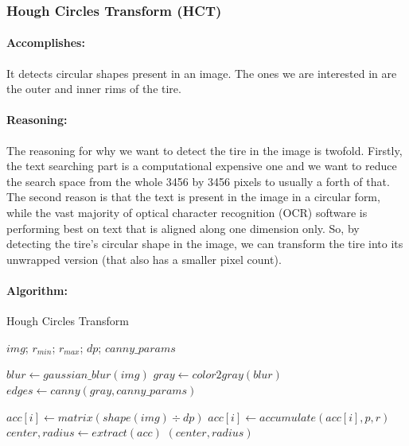 
\subsubsection{Hough Circles Transform (HCT)}
\label{subsubsec:hough_circles_transform}

\paragraph*{Accomplishes:}\mbox{}\par
It detects circular shapes present in an image. The ones we are interested in are the outer and inner rims of the tire.

\paragraph*{Reasoning:}\mbox{}\par
The reasoning for why we want to detect the tire in the image is twofold. Firstly, the text searching part is a computational expensive one and we want to reduce the search space from the whole 3456 by 3456 pixels to usually a forth of that. The second reason is that the text is present in the image in a circular form, while the vast majority of optical character recognition (OCR) software is performing best on text that is aligned along one dimension only. So, by detecting the tire's circular shape in the image, we can transform the tire into its unwrapped version (that also has a smaller pixel count).

\paragraph*{Algorithm:}\mbox{}\par

\begin{algorithm}
    \caption{Hough Circles Transform}\label{alg:Hough_Circles}
    \begin{algorithmic}[1]
        \Require $img$; $r_{min}$; $r_{max}$; $dp$; $canny\_params$

        \State $blur \gets gaussian\_blur(img)$
        \State $gray \gets color2gray(blur)$
        \State $edges \gets canny(gray, canny\_params)$

        \label{line:Hough_Circles:for_r}
            \State $acc[i] \gets matrix(shape(img) \div dp)$
            \label{line:Hough_Circles:for_p}
                \State $acc[i] \gets accumulate(acc[i], p, r)$
            \EndFor
        \EndFor
    \State $center, radius \gets extract(acc)$\label{line:Hough_Circles:extract}
    \State \Return $(center, radius)$
    \end{algorithmic}
\end{algorithm}

